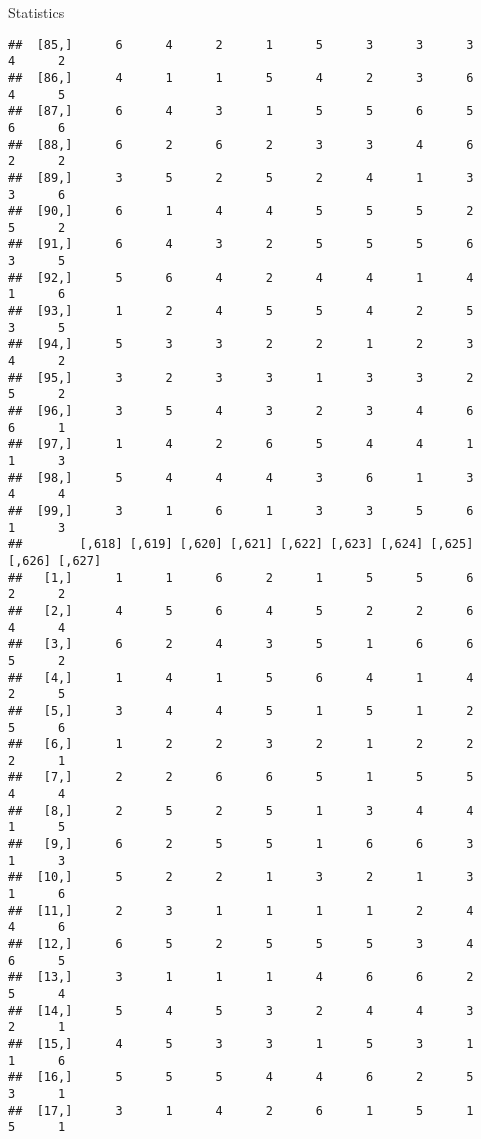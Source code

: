 \documentclass[
  ignorenonframetext,
]{beamer}
\begin{document}
\begin{frame}[fragile]{Statistics}
\begin{verbatim}
##  [85,]      6      4      2      1      5      3      3      3      4      2
##  [86,]      4      1      1      5      4      2      3      6      4      5
##  [87,]      6      4      3      1      5      5      6      5      6      6
##  [88,]      6      2      6      2      3      3      4      6      2      2
##  [89,]      3      5      2      5      2      4      1      3      3      6
##  [90,]      6      1      4      4      5      5      5      2      5      2
##  [91,]      6      4      3      2      5      5      5      6      3      5
##  [92,]      5      6      4      2      4      4      1      4      1      6
##  [93,]      1      2      4      5      5      4      2      5      3      5
##  [94,]      5      3      3      2      2      1      2      3      4      2
##  [95,]      3      2      3      3      1      3      3      2      5      2
##  [96,]      3      5      4      3      2      3      4      6      6      1
##  [97,]      1      4      2      6      5      4      4      1      1      3
##  [98,]      5      4      4      4      3      6      1      3      4      4
##  [99,]      3      1      6      1      3      3      5      6      1      3
##        [,618] [,619] [,620] [,621] [,622] [,623] [,624] [,625] [,626] [,627]
##   [1,]      1      1      6      2      1      5      5      6      2      2
##   [2,]      4      5      6      4      5      2      2      6      4      4
##   [3,]      6      2      4      3      5      1      6      6      5      2
##   [4,]      1      4      1      5      6      4      1      4      2      5
##   [5,]      3      4      4      5      1      5      1      2      5      6
##   [6,]      1      2      2      3      2      1      2      2      2      1
##   [7,]      2      2      6      6      5      1      5      5      4      4
##   [8,]      2      5      2      5      1      3      4      4      1      5
##   [9,]      6      2      5      5      1      6      6      3      1      3
##  [10,]      5      2      2      1      3      2      1      3      1      6
##  [11,]      2      3      1      1      1      1      2      4      4      6
##  [12,]      6      5      2      5      5      5      3      4      6      5
##  [13,]      3      1      1      1      4      6      6      2      5      4
##  [14,]      5      4      5      3      2      4      4      3      2      1
##  [15,]      4      5      3      3      1      5      3      1      1      6
##  [16,]      5      5      5      4      4      6      2      5      3      1
##  [17,]      3      1      4      2      6      1      5      1      5      1

\end{verbatim}
\end{frame}
\end{document}
